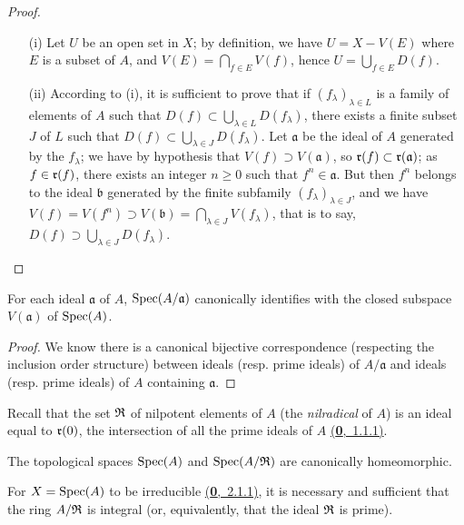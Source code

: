 \begin{proof}
\label{proof-prop-1.1.1.10}
\medskip\noindent
\begin{itemize}
  \item[(i)] Let $U$ be an open set in $X$; by definition, we have $U=X-V(E)$ where $E$ is a subset of
$A$, and $V(E)=\bigcap_{f\in E}V(f)$, hence $U=\bigcup_{f\in E}D(f)$.
  \item[(ii)] According to (i), it is sufficient to prove that if $(f_\lambda)_{\lambda\in L}$ is a
family of elements of $A$ such that $D(f)\subset\bigcup_{\lambda\in L}D(f_\lambda)$, there
exists a finite subset $J$ of $L$ such that $D(f)\subset\bigcup_{\lambda\in J}D(f_\lambda)$.
Let $\mathfrak{a}$ be the ideal of $A$ generated by the $f_\lambda$; we have by hypothesis
that $V(f)\supset V(\mathfrak{a})$, so $\mathfrak{r}(f)\subset\mathfrak{r}(\mathfrak{a})$; as $f\in\mathfrak{r}(f)$,
there exists an integer $n\geqslant 0$ such that $f^n\in\mathfrak{a}$. But then $f^n$ belongs
to the ideal $\mathfrak{b}$ generated by the finite subfamily $(f_\lambda)_{\lambda\in J}$,
and we have $V(f)=V(f^n)\supset V(\mathfrak{b})=\bigcap_{\lambda\in J}V(f_\lambda)$, that is
to say, $D(f)\supset\bigcup_{\lambda\in J}D(f_\lambda)$.
\end{itemize}
\end{proof}

\begin{prop}[1.1.11]
\label{prop-1.1.1.11}
For each ideal $\mathfrak{a}$ of $A$, ${\mathop{\mathrm{Spec}}\nolimits}(A/\mathfrak{a})$ canonically identifies with the
closed subspace $V(\mathfrak{a})$ of ${\mathop{\mathrm{Spec}}\nolimits}(A)$.
\end{prop}

\begin{proof}
\label{proof-prop-1.1.1.11}
We know there is a canonical bijective correspondence (respecting the inclusion order
structure) between ideals (resp. prime ideals) of $A/\mathfrak{a}$ and ideals (resp. prime
ideals) of $A$ containing $\mathfrak{a}$.
\end{proof}

Recall that the set $\mathfrak{R}$ of nilpotent elements of $A$ (the {\it nilradical} of $A$) is
an ideal equal to $\mathfrak{r}(0)$, the intersection of all the prime ideals of $A$
\hyperref[env-0.1.1.1]{(\textbf{0},~1.1.1)}.

\begin{cor}[1.1.12]
\label{cor-1.1.1.12}
The topological spaces ${\mathop{\mathrm{Spec}}\nolimits}(A)$ and ${\mathop{\mathrm{Spec}}\nolimits}(A/\mathfrak{R})$ are canonically homeomorphic.
\end{cor}

\begin{prop}[1.1.13]
\label{prop-1.1.1.13}
For $X={\mathop{\mathrm{Spec}}\nolimits}(A)$ to be irreducible \hyperref[env-0.2.1.1]{(\textbf{0},~2.1.1)}, it is necessary and
sufficient that the ring $A/\mathfrak{R}$ is integral (or, equivalently, that the ideal $\mathfrak{R}$ is prime).
\end{prop}

